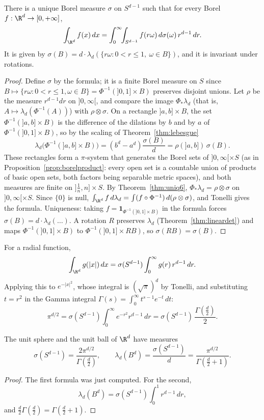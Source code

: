 \begin{theorem}\label{thm:polar}
There is a unique Borel measure $\sigma$ on $S^{d-1}$ such that for every Borel $f:\R^d\to[0,+\infty]$,
\[\int_{\R^d}f(x)\,dx=\int_0^\infty\!\!\int_{S^{d-1}}f(r\omega)\,d\sigma(\omega)\,r^{d-1}\,dr.\]
It is given by $\sigma(B)=d\cdot\lambda_d(\{r\omega:0<r\le1,\ \omega\in B\})$, and it is invariant under rotations.
\end{theorem}
\begin{proof}
Define $\sigma$ by the formula; it is a finite Borel measure on $S$ since $B\mapsto\{r\omega:0<r\le1,\omega\in B\}=\Phi^{-1}(]0,1]\times B)$ preserves disjoint unions. Let $\rho$ be the measure $r^{d-1}dr$ on $]0,\infty[$, and
compare the image $\Phi_*\lambda_d$ (that is, $A\mapsto\lambda_d(\Phi^{-1}(A))$) with $\rho\otimes\sigma$. On a rectangle $]a,b]\times B$, the set $\Phi^{-1}(]a,b]\times B)$ is the difference of the dilations by $b$ and by $a$ of
$\Phi^{-1}(]0,1]\times B)$, so by the scaling of Theorem~\ref{thm:lebesgue}
\[\lambda_d\bigl(\Phi^{-1}(]a,b]\times B)\bigr)=(b^d-a^d)\frac{\sigma(B)}d=\rho(]a,b])\,\sigma(B).\]
These rectangles form a $\pi$-system that generates the Borel sets of $]0,\infty[\times S$ (as in Proposition~\ref{prop:borelproduct}: every open set is a countable union of products of basic open sets, both
factors being separable metric spaces), and both measures are finite on $]\frac1n,n]\times S$. By Theorem~\ref{thm:uniq6}, $\Phi_*\lambda_d=\rho\otimes\sigma$ on $]0,\infty[\times S$. Since $\{0\}$ is null,
$\int_{\R^d}f\,d\lambda_d=\int(f\circ\Phi^{-1})\,d(\rho\otimes\sigma)$, and Tonelli gives the formula. Uniqueness: taking $f=\mathbf 1_{\Phi^{-1}(]0,1]\times B)}$ in the formula forces $\sigma(B)=d\cdot\lambda_d(\ldots)$. A rotation $R$
preserves $\lambda_d$ (Theorem~\ref{thm:lineardet}) and maps $\Phi^{-1}(]0,1]\times B)$ to $\Phi^{-1}(]0,1]\times RB)$, so $\sigma(RB)=\sigma(B)$.
\end{proof}

For a radial function,
\[\int_{\R^d}g(|x|)\,dx=\sigma(S^{d-1})\int_0^\infty g(r)\,r^{d-1}\,dr.\]
Applying this to $e^{-|x|^2}$, whose integral is $(\sqrt\pi)^d$ by Tonelli, and substituting $t=r^2$ in the Gamma
integral $\Gamma(s)=\int_0^\infty t^{s-1}e^{-t}\,dt$:
\[\pi^{d/2}=\sigma(S^{d-1})\int_0^\infty e^{-r^2}r^{d-1}\,dr=\sigma(S^{d-1})\,\frac{\Gamma(\frac d2)}2.\]

\begin{theorem}\label{thm:ball}
The unit sphere and the unit ball of $\R^d$ have measures
\[\sigma(S^{d-1})=\frac{2\pi^{d/2}}{\Gamma(\frac d2)},\qquad\lambda_d(B^d)=\frac{\sigma(S^{d-1})}d=\frac{\pi^{d/2}}{\Gamma(\frac d2+1)}.\]
\end{theorem}
\begin{proof}
The first formula was just computed. For the second,
\[
\lambda_d(B^d)=\sigma(S^{d-1})\int_0^1r^{d-1}\,dr,
\]
and $\frac d2\Gamma(\frac d2)=\Gamma(\frac d2+1)$.
\end{proof}

